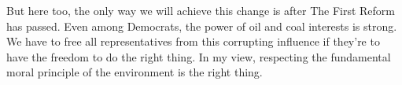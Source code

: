 But here too, the only way we will achieve this change is after The First Reform has passed. Even among Democrats, the power of oil and coal interests is strong. We have to free all representatives from this corrupting influence if they're to have the freedom to do the right thing. In my view, respecting the fundamental moral principle of the environment is the right thing.


